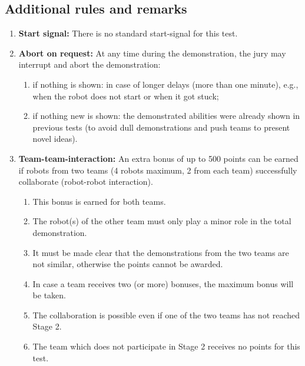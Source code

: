 \subsection{Additional rules and remarks}
\begin{enumerate}
	\item \textbf{Start signal:} There is no standard start-signal for this test.
	\item \textbf{Abort on request:} At any time during the demonstration, the jury may interrupt and abort the demonstration:
	\begin{enumerate}
		\item if nothing is shown: in case of longer delays (more than one minute), e.g., when the robot does not start or when it got stuck;
		\item if nothing new is shown: the demonstrated abilities were already shown in previous tests (to avoid dull demonstrations and push teams to present novel ideas).
	\end{enumerate}

	\item \textbf{Team-team-interaction:}  An extra bonus of up to 500 points can be earned if robots from two teams (4 robots maximum, 2 from each team) successfully collaborate (robot-robot interaction).
	\begin{enumerate}
		\item This bonus is earned for both teams.
		\item The robot(s) of the other team must only play a minor role in the total demonstration.
		\item It must be made clear that the demonstrations from the two teams are not similar, otherwise the points cannot be awarded.
		\item In case a team receives two (or more) bonuses, the maximum bonus will be taken.
		\item The collaboration is possible even if one of the two teams has not reached Stage 2.
		\item The team which does not participate in Stage 2 receives no points for this test.
	\end{enumerate}
\end{enumerate}


